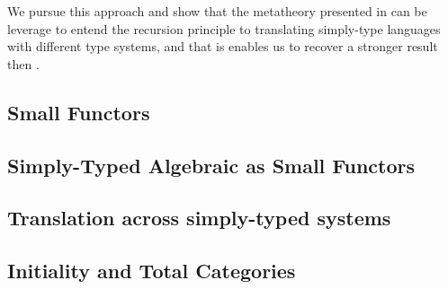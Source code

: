 


\vspace*{2cm}

We pursue this approach and show that the metatheory presented in
 can be leverage to entend the recursion principle to
translating simply-type languages with different type systems, and that is
enables us to recover a stronger result then \cite{ExtendedInitiality12}.

\subsection{Small Functors}

\subsection{Simply-Typed Algebraic as Small Functors}

\subsection{Translation across simply-typed systems}

\subsection{Initiality and Total Categories}
